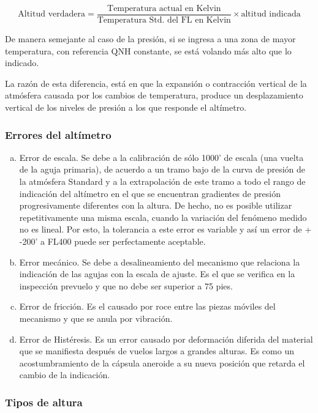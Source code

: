 \documentclass{article}
\begin{document}
$$ \text{Altitud verdadera} = \frac{\text{Temperatura actual en Kelvin}}{\text{Temperatura Std. del FL en Kelvin}}\times\text{altitud indicada}$$

De manera semejante al caso de la presión, si se ingresa a una zona de mayor temperatura, con referencia QNH constante, se está volando más alto que lo indicado.

La razón de esta diferencia, está en que la expansión o contracción vertical de la atmósfera causada por los cambios de temperatura, produce un desplazamiento vertical de los niveles de presión a los que responde el altímetro.



\subsubsection*{Errores del altímetro}
\begin{enumerate}[a.]
\item Error de escala. Se debe a la calibración de sólo 1000' de escala (una vuelta de la aguja primaria), de acuerdo a un tramo bajo de la curva de presión de la atmósfera Standard y a la extrapolación de este tramo a todo el rango de indicación del altímetro en el que se encuentran gradientes de presión progresivamente diferentes con la altura. De hecho, no es posible utilizar repetitivamente una misma escala, cuando la variación del fenómeno medido no es lineal. Por esto, la tolerancia a este error es variable y así un error de + -200' a FL400 puede ser perfectamente aceptable.
\item Error mecánico. Se debe a desalineamiento del mecanismo que relaciona la indicación de las agujas con la escala de ajuste. Es el que se verifica en la inspección prevuelo y que no debe ser superior a 75 pies.
\item Error de fricción. Es el causado por roce entre las piezas móviles del mecanismo y que se anula por vibración.
\item Error de Histéresis. Es un error causado por deformación diferida del material que se manifiesta después de vuelos largos a grandes alturas. Es como un acostumbramiento de la cápsula aneroide a su nueva posición que
retarda el cambio de la indicación.
\end{enumerate}

\subsubsection*{Tipos de altura}
\end{document}
